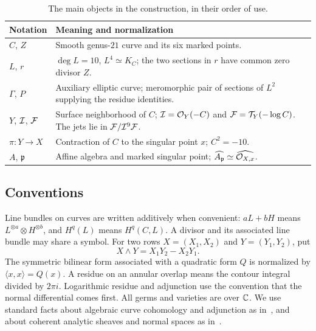 \begin{table}[htbp]
\centering
\small
\begin{tabular}{@{}p{}p{}@{}}
\toprule
Notation & Meaning and normalization \\
\midrule
$C$, $Z$ & Smooth genus-$21$ curve and its six marked points. \\
$L$, $r$ & $\deg L=10$, $L^4\simeq K_C$; the two sections in $r$ have
common zero divisor $Z$. \\
$\Gamma$, $P$ & Auxiliary elliptic curve; meromorphic pair of sections
of $L^2$ supplying the residue identities. \\
$Y$, $\mathcal I$, $\mathcal F$ & Surface neighborhood of $C$; $\mathcal I=\mathcal O_Y(-C)$ and
$\mathcal F=\mathcal T_Y(-\log C)$. The jets lie in $\mathcal F/\mathcal I^9\mathcal F$. \\
$\pi:Y\to X$ & Contraction of $C$ to the singular point $x$;
$C^2=-10$. \\
$A$, $\mathfrak p$ & Affine algebra and marked singular point;
\mbox{$\widehat{A_{\mathfrak p}}\simeq\widehat{\mathcal O_{X,x}}$}. \\
\bottomrule
\end{tabular}
\caption{The main objects in the construction, in their order of use.}
\label{tab:notation}
\end{table}

\subsection{Conventions}

Line bundles on curves are written additively when convenient: $aL+bH$ means $L^{\otimes a}\otimes H^{\otimes b}$, and $H^q(L)$ means $H^q(C,L)$. A divisor and its associated line bundle may share a symbol. For two rows $X=(X_1,X_2)$ and $Y=(Y_1,Y_2)$, put
\[
X\wedge Y=X_1Y_2-X_2Y_1.
\]
The symmetric bilinear form associated with a quadratic form $Q$ is normalized by $\langle x,x\rangle=Q(x)$. A residue on an annular overlap means the contour integral divided by $2\pi i$. Logarithmic residue and adjunction use the convention that the normal differential comes first. All germs and varieties are over $\mathbb C$. We use standard facts about algebraic curve cohomology and adjunction as in~\cite{Hartshorne1977}, and about coherent analytic sheaves and normal spaces as in~\cite{GrauertRemmert1984}.
